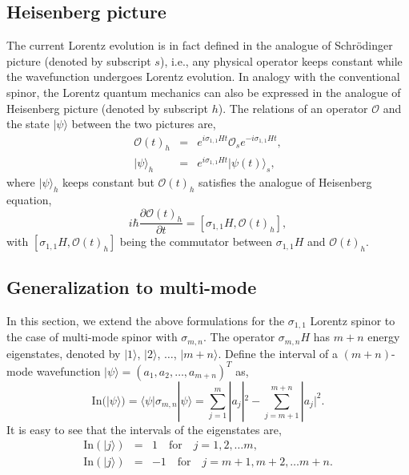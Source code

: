 \documentclass[pra,epsfig,rotate,superscriptaddress,showpacs]{revtex4}
\begin{document}
\subsection{Heisenberg picture}

The current Lorentz evolution is in fact defined in the analogue of Schr\"odinger picture (denoted by subscript $s$), i.e., any physical operator keeps constant while the wavefunction undergoes Lorentz evolution. In analogy with the conventional spinor, the Lorentz quantum mechanics can also be expressed in the analogue of Heisenberg picture (denoted by subscript $h$). The relations of an operator $\mathcal{O}$ and the state $|\psi\rangle$ between the two pictures are,
\begin{eqnarray}
\mathcal{O}(t)_h&=&e^{i\sigma_{1,1}Ht}\mathcal{O}_s e^{-i\sigma_{1,1}Ht}, \\
|\psi\rangle_h&=&e^{i\sigma_{1,1}Ht} |\psi(t)\rangle_s,
\end{eqnarray}
where $|\psi\rangle_h$ keeps constant but $\mathcal{O}(t)_h$ satisfies the analogue of Heisenberg equation,
\begin{equation}
i\hbar \frac{\partial \mathcal{O}(t)_h }{\partial t}=[\sigma_{1,1}H,\mathcal{O}(t)_h],
\end{equation}
with $[\sigma_{1,1}H,\mathcal{O}(t)_h]$ being the commutator between $\sigma_{1,1}H$ and $\mathcal{O}(t)_h$.


\subsection{Generalization to multi-mode}

In this section, we extend the above formulations for the $\sigma_{1,1}$ Lorentz spinor to the case of multi-mode spinor with $\sigma_{m,n}$. The operator $\sigma_{m,n}H$ has $m+n$ energy eigenstates, denoted by $|1\rangle$, $|2\rangle$, $\ldots$, $|m+n\rangle$.
Define the interval of a $(m+n)$-mode wavefunction $|\psi\rangle=(a_1,a_2,\ldots,a_{m+n})^T$ as,
\begin{equation}
{\text {In}}(|\psi\rangle)=\langle\psi|\sigma_{m,n}|\psi\rangle=\sum_{j=1}^{m} |a_j|^2-\sum_{j=m+1}^{m+n}  |a_j|^2.	
\end{equation}
It is easy to see that the intervals of the eigenstates are,
\begin{eqnarray}\label{intervm}
{\text {In}}(|j\rangle)&=&1 \quad {\text{for}} \quad j=1,2,\ldots m, \\ \nonumber
{\text {In}}(|j\rangle)&=&-1 \quad {\text{for}}\quad j=m+1,m+2,\ldots m+n.
\end{eqnarray}
\end{document}
